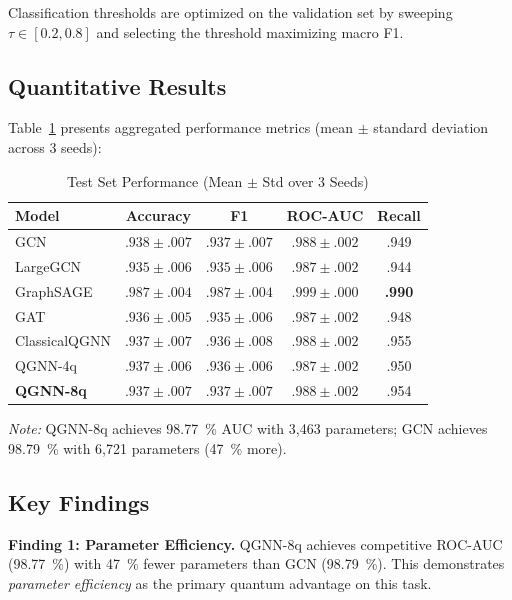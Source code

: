 \documentclass[conference]{IEEEtran}
\begin{document}
Classification thresholds are optimized on the validation set by sweeping $\tau \in [0.2, 0.8]$ and selecting the threshold maximizing macro F1.

\subsection{Quantitative Results}

Table~\ref{tab:results} presents aggregated performance metrics (mean $\pm$ standard deviation across 3 seeds):

\begin{table}[t]
\centering
\caption{Test Set Performance (Mean $\pm$ Std over 3 Seeds)}
\label{tab:results}
\begin{tabular}{@{}lcccc@{}}
\toprule
\textbf{Model} & \textbf{Accuracy} & \textbf{F1} & \textbf{ROC-AUC} & \textbf{Recall} \\
\midrule
GCN & $.938 \pm .007$ & $.937 \pm .007$ & $.988 \pm .002$ & .949 \\
LargeGCN & $.935 \pm .006$ & $.935 \pm .006$ & $.987 \pm .002$ & .944 \\
GraphSAGE & $\mathbf{.987 \pm .004}$ & $\mathbf{.987 \pm .004}$ & $\mathbf{.999 \pm .000}$ & \textbf{.990} \\
GAT & $.936 \pm .005$ & $.935 \pm .006$ & $.987 \pm .002$ & .948 \\
\midrule
ClassicalQGNN & $.937 \pm .007$ & $.936 \pm .008$ & $.988 \pm .002$ & .955 \\
QGNN-4q & $.937 \pm .006$ & $.936 \pm .006$ & $.987 \pm .002$ & .950 \\
\textbf{QGNN-8q} & $.937 \pm .007$ & $.937 \pm .007$ & $.988 \pm .002$ & .954 \\
\bottomrule
\end{tabular}
\vspace{1mm}
\footnotesize{\textit{Note:} QGNN-8q achieves \SI{98.77}{\percent} AUC with 3,463 parameters; GCN achieves \SI{98.79}{\percent} with 6,721 parameters (\SI{47}{\percent} more).}
\end{table}

\subsection{Key Findings}

\textbf{Finding 1: Parameter Efficiency.} QGNN-8q achieves competitive ROC-AUC (\SI{98.77}{\percent}) with \SI{47}{\percent} fewer parameters than GCN (\SI{98.79}{\percent}). This demonstrates \textit{parameter efficiency} as the primary quantum advantage on this task.
\end{document}
